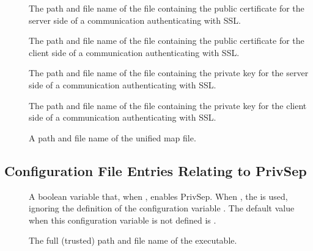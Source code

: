 \begin{description}
\item[]
\label{param:AuthSSLServerCertfile}  
The path and file name of
the file containing the public certificate
for the server side of a communication authenticating
with SSL.

\item[]
\label{param:AuthSSLClientCertfile}
The path and file name of
the file containing the public certificate
for the client side of a communication authenticating
with SSL.


\item[]
\label{param:AuthSSLServerKeyfile}
The path and file name of
the file containing the private key
for the server side of a communication authenticating
with SSL.

\item[]
\label{param:AuthSSLClientKeyfile}
The path and file name of
the file containing the private key
for the client side of a communication authenticating
with SSL.


\item[]
\label{param:CertificateMapfile}
A path and file name of the unified map file.

\end{description}

\subsection{\label{sec:Config-PrivSep}Configuration File Entries
Relating to PrivSep}
\begin{description}
\item[]
  \label{param:PrivSepEnabled}
  A boolean variable that, when , enables PrivSep.
  When , the  is used,
  ignoring the definition of the configuration variable .
  The default value when this configuration variable is not defined
  is .

\item[]
  \label{param:PrivSepSwitchboard}
  The full (trusted) path and file name of the 
  executable.
\end{description}

